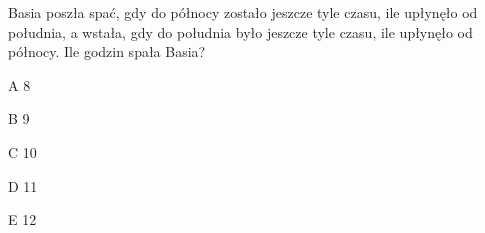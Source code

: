 \begin{tresc}
Basia poszła spać, gdy do północy zostało jeszcze tyle czasu, ile upłynęło od południa, a wstała, gdy do południa było jeszcze tyle czasu, ile upłynęło od północy. Ile godzin spała Basia?
\end{tresc}
\begin{wariant}{A} 8 \end{wariant}
\begin{wariant}{B} 9 \end{wariant}
\begin{wariant}{C} 10 \end{wariant}
\begin{wariant}{D} 11 \end{wariant}
\begin{wariant}{E} 12 \end{wariant}
